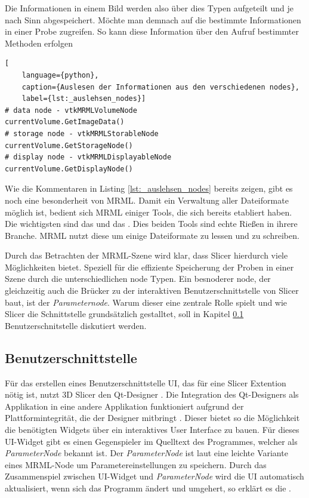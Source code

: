 Die Informationen in einem Bild werden also über dies Typen aufgeteilt und je nach
Sinn abgespeichert. Möchte man demnach auf die bestimmte Informationen in einer
Probe zugreifen. So kann diese Information über den Aufruf bestimmter Methoden erfolgen

\begin{lstlisting}[
	language={python},
	caption={Auslesen der Informationen aus den verschiedenen nodes},
	label={lst:_auslehsen_nodes}]
# data node - vtkMRMLVolumeNode
currentVolume.GetImageData()
# storage node - vtkMRMLStorableNode
currentVolume.GetStorageNode()
# display node - vtkMRMLDisplayableNode
currentVolume.GetDisplayNode()
\end{lstlisting}

Wie die Kommentaren in Listing \ref{lst:_auslehsen_nodes} bereits zeigen, gibt
es noch eine besonderheit von MRML. Damit ein Verwaltung aller Dateiformate möglich
ist, bedient sich MRML einiger Tools, die sich bereits etabliert haben. Die
wichtigsten sind das \citet{vtk2024} und das \citet{itk2024}. Dies beiden Tools sind
echte Rießen in ihrere Branche. MRML nutzt diese um einige Dateiformate zu
lessen und zu schreiben.

Durch das Betrachten der MRML-Szene wird klar, dass Slicer hierdurch viele Möglichkeiten
bietet. Speziell für die effiziente Speicherung der Proben in einer Szene durch
die unterschiedlichen node Typen. Ein besnoderer node, der gleichzeitig auch die
Brücker zu der interaktiven Benutzerschnittstelle von Slicer baut, ist der \textit{Parameternode}.
Warum dieser eine zentrale Rolle spielt und wie Slicer die Schnittstelle grundsätzlich
gestalltet, soll in Kapitel \ref{subsec:benutzerschnitstelle}
Benutzerschnitstelle diskutiert werden.

\subsection{Benutzerschnittstelle}
\label{subsec:benutzerschnitstelle} Für das erstellen eines
Benutzerschnittstelle \ac{UI}, das für eine Slicer Extention
nötig ist, nutzt 3D Slicer den Qt-Designer \citep[vgl.][]{qt2024}. Die
Integration des Qt-Designers als Applikation in eine andere Applikation
funktioniert aufgrund der Plattformintegrität, die der Designer mitbringt \citep[vgl.][]{qt2024}.
Dieser bietet so die Möglichkeit die benötigten Widgets über ein interaktives User
Interface zu bauen. Für dieses UI-Widget gibt es einen Gegenspieler im Quelltext
des Programmes, welcher als \textit{ParameterNode} bekannt ist. Der \textit{ParameterNode}
ist laut \citet{slicer2024} eine leichte Variante eines MRML-Node um Parametereinstellungen
zu speichern. Durch das Zusammenspiel zwischen UI-Widget und \textit{ParameterNode}
wird die UI automatisch aktualisiert, wenn sich das Programm ändert und umgehert,
so erklärt es die \citet{slicer2024}.

